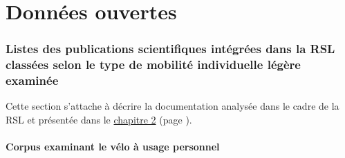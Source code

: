 
    \newpage
\part*{Données ouvertes}
    \label{donnees-ouvertes:titre}
    \renewcommand{\thesection}{\Alph{section}}
    \setcounter{section}{0}

    \newpage
\section{Listes des publications scientifiques intégrées dans la \acrshort{RSL} classées selon le type de \gls{mobilité individuelle légère} examinée}
    \label{donnees-ouvertes:rsl_publications_type_mobilite_individuelle_legere}

Cette section s'attache à décrire la documentation analysée dans le cadre de la \acrfull{RSL} et présentée dans le \hyperref[chap2:titre]{chapitre 2} (page \pageref{chap2:titre}).\par

\subsection{Corpus examinant le vélo à usage personnel}
    \label{donnees-ouvertes:rsl_publications_velo_personnel}

